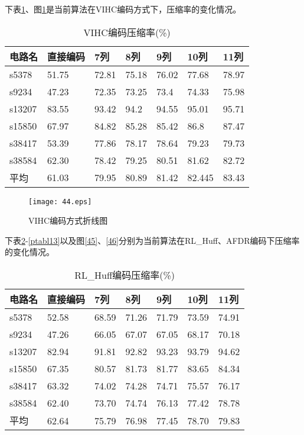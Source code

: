 下表\ref{ptabl11}、图\ref{44}是当前算法在VIHC编码方式下，压缩率的变化情况。

\begin{table}[H]
\centering
\caption{VIHC编码压缩率(\%)}\label{ptabl11}
\begin{tabular}{p{1.4cm}p{2cm}<{\centering}p{1.8cm}<{\centering}p{1.8cm}<{\centering}p{1.8cm}<{\centering}
p{1.8cm}<{\centering}p{1.8cm}<{\centering}}
\toprule
\textbf{电路名}&	\textbf{直接编码}& \textbf{7列}& \textbf{8列}& \textbf{9列}& \textbf{10列}& \textbf{11列}\\
\midrule
s5378&	51.75&	72.81&	75.18&	76.02&	77.68&	78.97\\
s9234&	47.23&	72.35&	73.25&	73.4&	74.33&	75.98\\
s13207&	83.55&	93.42&	94.2&	94.55&	95.01&	95.71\\
s15850&	67.97&	84.82&	85.28&	85.42&	86.8&	87.47\\
s38417&	53.39&	77.86&	78.17&	78.64&	79.23&	79.73\\
s38584&	62.30& 	78.42&	79.25&	80.51&	81.62&	82.72\\
平均&	61.03&	79.95&	80.89&	81.42&	82.445&	83.43\\
\bottomrule
\end{tabular}
\end{table}

\begin{figure}[H]
  \centering
  \texttt{[image: 44.eps]}
  \caption{VIHC编码方式折线图}\label{44}
     \end{figure}

下表\ref{ptabl12}-\ref{ptabl13}以及图\ref{45}、\ref{46}分别为当前算法在RL\_Huff、AFDR编码下压缩率的变化情况。

\begin{table}[H]
\centering
\caption{RL\_Huff编码压缩率(\%)}\label{ptabl12}
\begin{tabular}{p{1.4cm}p{2cm}<{\centering}p{1.8cm}<{\centering}p{1.8cm}<{\centering}p{1.8cm}<{\centering}
p{1.8cm}<{\centering}p{1.8cm}<{\centering}}
\toprule
\textbf{电路名}&	\textbf{直接编码}& \textbf{7列}& \textbf{8列}& \textbf{9列}& \textbf{10列}& \textbf{11列}\\
\midrule
s5378&	52.58&  68.59&	71.26&	71.79&	73.59&	74.91\\
s9234&	47.26&  66.05&	67.07&	67.05&	68.17&	70.18\\
s13207&	82.94&  91.81&	92.82&	93.23&	93.79&	94.62\\
s15850&	67.35&  80.57&	81.73&	81.77&	83.65&	84.34\\
s38417&	63.32&  74.02&	74.28&	74.71&	75.57&	76.17\\
s38584&	62.40&  73.70&	74.74&	76.13&	77.42&	78.78\\
平均&	62.64&  75.79&	76.98&	77.45&	78.70&	79.83\\
\bottomrule
\end{tabular}
\end{table}

